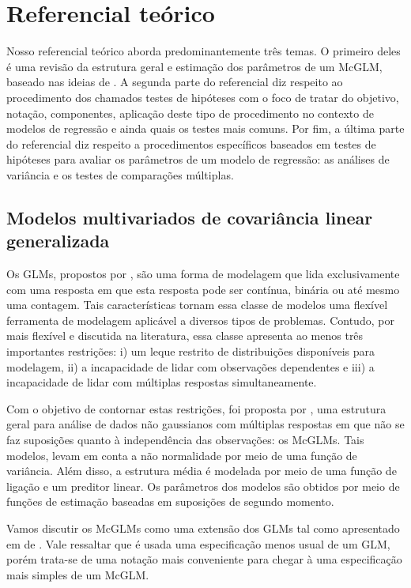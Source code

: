 \chapter{Referencial teórico}

Nosso referencial teórico aborda predominantemente três temas. O primeiro deles é uma revisão da estrutura geral e estimação dos parâmetros de um McGLM, baseado nas ideias de \citet{Bonat16}. A segunda parte do referencial diz respeito ao procedimento dos chamados testes de hipóteses com o foco de tratar do objetivo, notação, componentes, aplicação deste tipo de procedimento no contexto de modelos de regressão e ainda quais os testes mais comuns. Por fim, a última parte do referencial diz respeito a procedimentos específicos baseados em testes de hipóteses para avaliar os parâmetros de um modelo de regressão: as análises de variância e os testes de comparações múltiplas.


\section{Modelos multivariados de covariância linear generalizada}

Os GLMs, propostos por \citet{Nelder72}, são uma forma de modelagem que lida exclusivamente com uma resposta em que esta resposta pode ser contínua, binária ou até mesmo uma contagem. Tais características tornam essa classe de modelos uma flexível ferramenta de modelagem aplicável a diversos tipos de problemas. Contudo, por mais flexível e discutida na literatura, essa classe apresenta ao menos três importantes restrições: i) um leque restrito de distribuições disponíveis para modelagem, ii) a incapacidade de lidar com observações dependentes e iii) a incapacidade de lidar com múltiplas respostas simultaneamente. 

Com o objetivo de contornar estas restrições, foi proposta por \citet{Bonat16}, uma estrutura geral para análise de dados não gaussianos com múltiplas respostas em que não se faz suposições quanto à independência das observações: os McGLMs. Tais modelos, levam em conta a não normalidade por meio de uma função de variância. Além disso, a estrutura média é modelada por meio de uma função de ligação e um preditor linear. Os parâmetros dos modelos são obtidos por meio de funções de estimação baseadas em suposições de segundo momento.

Vamos discutir os McGLMs como uma extensão dos GLMs tal como apresentado em de \citet{Bonat16}. Vale ressaltar que é usada uma especificação menos usual de um GLM, porém trata-se de uma notação mais conveniente para chegar à uma especificação mais simples de um McGLM.

